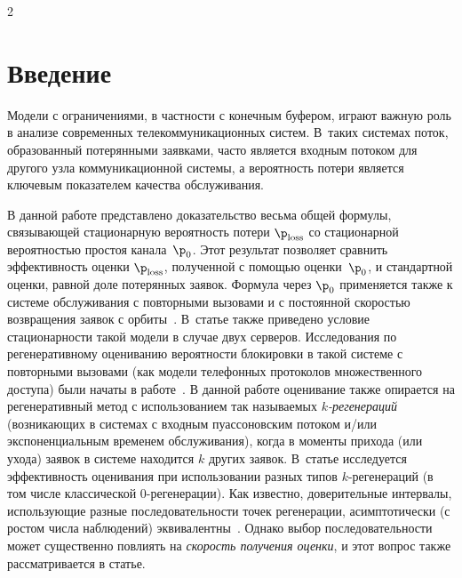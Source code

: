 
\vspace*{-7pt}


      \thispagestyle{headings}

      \begin{multicols}{2}

            \label{st\stat}


\section{Введение} 


Модели с ограничениями, в частности с конечным буфером, играют
важную роль в анализе современных     телекоммуникационных систем. 
В~таких системах поток, образованный потерянными заявками, часто
является входным потоком для другого узла коммуникационной системы,
а вероятность потери является ключевым показателем качества
обслуживания.


В данной работе  представлено  доказательство весьма общей формулы, связывающей
стационарную вероятность потери $\p_{\mathrm{loss}}$ со ста\-цио\-нарной\linebreak
вероятностью
простоя канала~$\p_0$.  Этот результат\linebreak
 позволяет сравнить эффективность оценки
$\p_{\mathrm{loss}}$, полученной с помощью оценки~$\p_0$, и  стандартной оценки, равной
доле потерянных заявок.  Формула через $\p_0$ применяется также
 к системе обслуживания с повторными вызовами и
с  постоянной скоростью возвращения заявок с орбиты~\cite{Avr}.   \mbox{В~статье}
также приведено условие стационарности такой модели в случае
двух серверов. Исследования по регенеративному оцениванию
вероятности блокировки в такой сис\-те\-ме  с повторными вызовами  (как  модели телефонных
протоколов  множественного доступа) были начаты   в работе~\cite{Minsk}.
 В  данной работе оценивание  также  опирается на регенеративный  метод с
использованием так называемых {\it  $k$-ре\-ге\-не\-ра\-ций} (возникающих в сис\-те\-мах с
входным пуассоновским потоком и/или экспоненциальным временем обслуживания),
когда в моменты прихода (или ухода) заявок в сис\-те\-ме находится $k$ других
заявок. В~статье исследуется эффективность оценивания при использовании
разных типов $k$-ре\-ге\-не\-ра\-ций (в том числе классической $0$-ре\-ге\-не\-ра\-ции). Как
известно,  доверительные интервалы, использующие разные последовательности
точек регенерации, асимптотически (с ростом числа наблюдений) эквивалентны~\cite{Shedler}.  
Однако выбор по\-сле\-до\-ва\-тель\-ности может существенно повлиять на
{\it скорость получения оценки}, и этот вопрос также рассматривается в статье.


\end{multicols}

